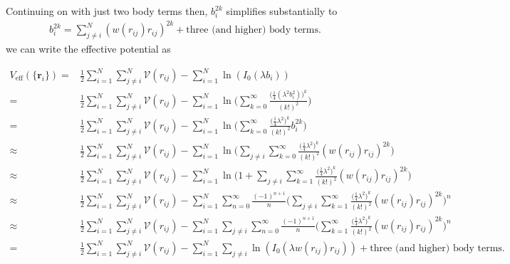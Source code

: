 \documentclass[twocolumn,amsmath,amssymb,aps]{revtex4-1}%
\begin{document}
Continuing on with just two body terms then, $b_i^{2k}$ simplifies
substantially to
\begin{align}
  b_i^{2k}=\sum_{j\neq i}^N(w(r_{ij})r_{ij})^{2k}
  +\textrm{three (and higher) body terms}.
\end{align}
we can write the effective
potential as
\begin{widetext}
  \begin{align}
    V_{\mathrm{eff}}(\{\bm{r}_i\})
    =&\frac{1}{2}\sum_{i=1}^N\sum_{j\neq i}^N\mathcal{V}(r_{ij})
    -\sum_{i=1}^N\ln(I_0(\lambda b_i))\nonumber\\
    =&\frac{1}{2}\sum_{i=1}^N\sum_{j\neq i}^N\mathcal{V}(r_{ij})
    -\sum_{i=1}^N\ln\bigg(\sum_{k=0}^{\infty}
    \frac{\bigg(\frac{1}{4}(\lambda^2 b_i^2)\bigg)^k}{(k!)^2}\bigg)\nonumber\\
    =&\frac{1}{2}\sum_{i=1}^N\sum_{j\neq i}^N\mathcal{V}(r_{ij})
    -\sum_{i=1}^N\ln\bigg(\sum_{k=0}^{\infty}
    \frac{\bigg(\frac{1}{4}\lambda^2\bigg)^k}{(k!)^2}b_i^{2k}\bigg)\nonumber\\
    \approx&\frac{1}{2}\sum_{i=1}^N\sum_{j\neq i}^N\mathcal{V}(r_{ij})
    -\sum_{i=1}^N\ln\bigg(\sum_{j\neq i}\sum_{k=0}^{\infty}
    \frac{\bigg(\frac{1}{4}\lambda^2\bigg)^k}{(k!)^2}
    (w(r_{ij})r_{ij})^{2k}\bigg)\nonumber\\
    \approx&\frac{1}{2}\sum_{i=1}^N\sum_{j\neq i}^N\mathcal{V}(r_{ij})
    -\sum_{i=1}^N\ln\bigg(1+\sum_{j\neq i}\sum_{k=1}^{\infty}
    \frac{\bigg(\frac{1}{4}\lambda^2\bigg)^k}{(k!)^2}
    (w(r_{ij})r_{ij})^{2k}\bigg)\nonumber\\
    \approx&\frac{1}{2}\sum_{i=1}^N\sum_{j\neq i}^N\mathcal{V}(r_{ij})
    -\sum_{i=1}^N\sum_{n=0}^{\infty}\frac{(-1)^{n+1}}{n}
    \bigg(\sum_{j\neq i}\sum_{k=1}^{\infty}
    \frac{\bigg(\frac{1}{4}\lambda^2\bigg)^k}{(k!)^2}
    (w(r_{ij})r_{ij})^{2k}\bigg)^n\nonumber\\
    \approx&\frac{1}{2}\sum_{i=1}^N\sum_{j\neq i}^N\mathcal{V}(r_{ij})
    -\sum_{i=1}^N\sum_{j\neq i}\sum_{n=0}^{\infty}\frac{(-1)^{n+1}}{n}
    \bigg(\sum_{k=1}^{\infty}
    \frac{\bigg(\frac{1}{4}\lambda^2\bigg)^k}{(k!)^2}
    (w(r_{ij})r_{ij})^{2k}\bigg)^n\nonumber\\
    =&\frac{1}{2}\sum_{i=1}^N\sum_{j\neq i}^N\mathcal{V}(r_{ij})
    -\sum_{i=1}^N\sum_{j\neq i}\ln(I_0(\lambda w(r_{ij})r_{ij}))
    +\textrm{three (and higher) body terms}.
  \end{align}
\end{widetext}
\end{document}
